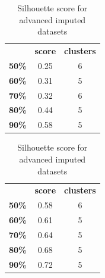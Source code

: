 \documentclass{article}
\begin{document}
\begin{table}[h]
\begin{minipage}{0.5\textwidth}\centering
\begin{tabular}{ccc}
              & \textbf{score} & \textbf{clusters} \\
\textbf{50\%} & 0.25                      & 6                           \\
\textbf{60\%} & 0.31                      & 5                           \\
\textbf{70\%} & 0.32                      & 6                           \\
\textbf{80\%} & 0.44                      & 5                           \\
\textbf{90\%} & 0.58                      & 5                          
\end{tabular}
\caption{Silhouette score for simple imputed datasets}
\end{minipage}
\hfill
\begin{minipage}{0.45\textwidth}\centering
\begin{tabular}{ccc}
              & \textbf{score} & \textbf{clusters} \\
\textbf{50\%} & 0.58                      & 6                           \\
\textbf{60\%} & 0.61                      & 5                           \\
\textbf{70\%} & 0.64                      & 5                           \\
\textbf{80\%} & 0.68                      & 5                           \\
\textbf{90\%} & 0.72                      & 5                          
\end{tabular}
\caption{Silhouette score for advanced imputed datasets}
\end{minipage}
\end{table}
\end{document}
